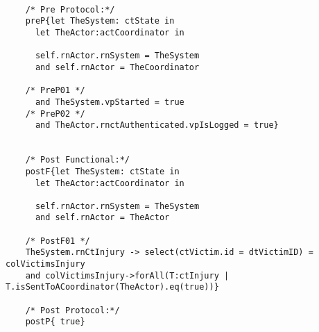 	\scriptsize
	\vspace{0.5cm}
	\begin{lstlisting}[style=MessirStyle,firstnumber=auto,captionpos=b,caption={\msrmessir (MCL-oriented) specification of the operation \emph{oeGetInjurySet}.},label=OM-actCoordinator-oeGetInjurySet-MCL-LST]

	/* Pre Protocol:*/ 
	preP{let TheSystem: ctState in
	  let TheActor:actCoordinator in
	  
	  self.rnActor.rnSystem = TheSystem
	  and self.rnActor = TheCoordinator
	  
	/* PreP01 */
	  and TheSystem.vpStarted = true
	/* PreP02 */
	  and TheActor.rnctAuthenticated.vpIsLogged = true}
	
	
	/* Post Functional:*/ 
	postF{let TheSystem: ctState in
	  let TheActor:actCoordinator in
	  
	  self.rnActor.rnSystem = TheSystem
	  and self.rnActor = TheActor
	  
	/* PostF01 */
	TheSystem.rnCtInjury -> select(ctVictim.id = dtVictimID) = colVictimsInjury
	and colVictimsInjury->forAll(T:ctInjury | T.isSentToACoordinator(TheActor).eq(true))}
	
	/* Post Protocol:*/ 
	postP{ true}
	
	\end{lstlisting}
	\normalsize 
	
	
	
	





